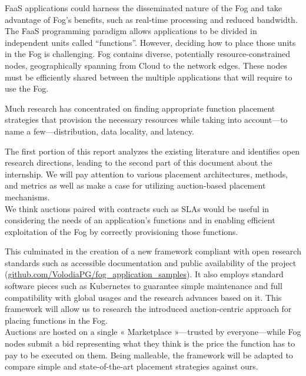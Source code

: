 \Gls{FaaS} applications could harness the disseminated nature of the Fog and take advantage of Fog’s benefits, such as real-time processing and reduced bandwidth. The \gls{FaaS} programming paradigm allows applications to be divided in independent units called “functions”. However, deciding how to place those units in the Fog is challenging. Fog contains diverse, potentially resource-constrained nodes, geographically spanning from Cloud to the network edges. These nodes must be efficiently shared between the multiple applications that will require to use the Fog.

Much research has concentrated on finding appropriate function placement strategies that provision the necessary resources while taking into account—to name a few—distribution, data locality, and latency.

The first portion of this report analyzes the existing literature and identifies open research directions, leading to the second part of this document about the internship. We will pay attention to various placement architectures, methods, and metrics as well as make a case for utilizing auction-based placement mechanisms.\\
We think auctions paired with contracts such as \glspl{SLA} would be useful in considering the needs of an application’s functions and in enabling efficient exploitation of the Fog by correctly provisioning those functions.

This culminated in the creation of a new framework compliant with open research standards such as accessible documentation and public availability of the project (\href{https://github.com/VolodiaPG/fog_application_samples}{github.com/VolodiaPG/fog\_application\_samples}). It also employs standard software pieces such as Kubernetes to guarantee simple maintenance and full compatibility with global usages and the research advances based on it. This framework will allow us to research the introduced auction-centric approach for placing functions in the Fog.\\
Auctions are hosted on a single « Marketplace »—trusted by everyone—while Fog nodes submit a bid representing what they think is the price the function has to pay to be executed on them. Being malleable, the framework will be adapted to compare simple and state-of-the-art placement strategies against ours.

